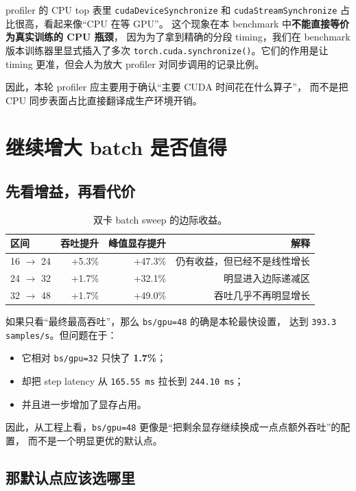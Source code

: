 \documentclass[11pt,a4paper]{ctexart}
\begin{document}
profiler 的 CPU top 表里 \texttt{cudaDeviceSynchronize} 和 \texttt{cudaStreamSynchronize}
占比很高，看起来像“CPU 在等 GPU”。
这个现象在本 benchmark 中\textbf{不能直接等价为真实训练的 CPU 瓶颈}，
因为为了拿到精确的分段 timing，我们在 benchmark 版本训练器里显式插入了多次
\texttt{torch.cuda.synchronize()}。它们的作用是让 timing 更准，但会人为放大 profiler
对同步调用的记录比例。

因此，本轮 profiler 应主要用于确认“主要 CUDA 时间花在什么算子”，
而不是把 CPU 同步表面占比直接翻译成生产环境开销。

\section{继续增大 batch 是否值得}

\subsection{先看增益，再看代价}

\begin{table}[H]
\centering
\small
\caption{双卡 batch sweep 的边际收益。}
\begin{tabular}{lrrr}
\toprule
区间 & 吞吐提升 & 峰值显存提升 & 解释 \\
\midrule
16 $\rightarrow$ 24 & +5.3\% & +47.3\% & 仍有收益，但已经不是线性增长 \\
24 $\rightarrow$ 32 & +1.7\% & +32.1\% & 明显进入边际递减区 \\
32 $\rightarrow$ 48 & +1.7\% & +49.0\% & 吞吐几乎不再明显增长 \\
\bottomrule
\end{tabular}
\end{table}

如果只看“最终最高吞吐”，那么 \texttt{bs/gpu=48} 的确是本轮最快设置，
达到 \texttt{393.3 samples/s}。但问题在于：
\begin{itemize}[leftmargin=2em]
  \item 它相对 \texttt{bs/gpu=32} 只快了 \textbf{1.7\%}；
  \item 却把 step latency 从 \texttt{165.55 ms} 拉长到 \texttt{244.10 ms}；
  \item 并且进一步增加了显存占用。
\end{itemize}

因此，从工程上看，\texttt{bs/gpu=48} 更像是“把剩余显存继续换成一点点额外吞吐”的配置，
而不是一个明显更优的默认点。

\subsection{那默认点应该选哪里}
\end{document}

